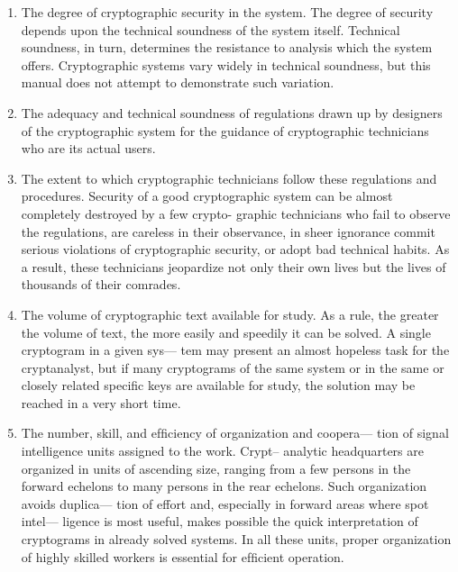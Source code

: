 \begin{enumerate}
\item The degree of cryptographic security in the system. The degree
of security depends upon the technical soundness of the system
itself. Technical soundness, in turn, determines the resistance
to analysis which the system offers. Cryptographic systems vary
widely in technical soundness, but this manual does not attempt
to demonstrate such variation.
 
\item The adequacy and technical soundness of regulations drawn up
by designers of the cryptographic system for the guidance of
cryptographic technicians who are its actual users.

\item The extent to which cryptographic technicians follow these
regulations and procedures. Security of a good cryptographic
system can be almost completely destroyed by a few crypto-
graphic technicians who fail to observe the regulations, are
careless in their observance, in sheer ignorance commit serious
violations of cryptographic security, or adopt bad technical
habits. As a result, these technicians jeopardize not only their
own lives but the lives of thousands of their comrades.

\item The volume of cryptographic text available for study. As a
rule, the greater the volume of text, the more easily and
speedily it can be solved. A single cryptogram in a given sys—
tem may present an almost hopeless task for the cryptanalyst,
but if many cryptograms of the same system or in the same or
closely related speciﬁc keys are available for study, the solution
may be reached in a very short time.

\item The number, skill, and efﬁciency of organization and coopera—
tion of signal intelligence units assigned to the work. Crypt--
analytic headquarters are organized in units of ascending size,
ranging from a few persons in the forward echelons to many
persons in the rear echelons. Such organization avoids duplica—
tion of effort and, especially in forward areas where spot intel—
ligence is most useful, makes possible the quick interpretation
of cryptograms in already solved systems. In all these units,
proper organization of highly skilled workers is essential for
efﬁcient operation.


\end{enumerate}
